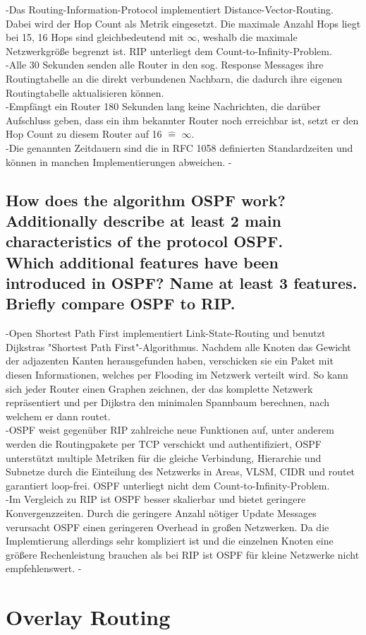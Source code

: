 \documentclass[a4paper,
			llpt,
			solution,
			accentcolor=tud2d,
			colorbacktitle
			]
			{tudexercise}
\newcommand{\8}{$\infty$}
\begin{document}
-Das Routing-Information-Protocol implementiert Distance-Vector-Routing. Dabei wird der Hop Count als Metrik eingesetzt. Die maximale Anzahl Hops liegt bei 15, 16 Hops sind gleichbedeutend mit \8, weshalb die maximale Netzwerkgröße begrenzt ist. RIP unterliegt dem Count-to-Infinity-Problem.\\
-Alle 30 Sekunden senden alle Router in den sog. Response Messages ihre Routingtabelle an die direkt verbundenen Nachbarn, die dadurch ihre eigenen Routingtabelle aktualisieren können.\\
-Empfängt ein Router 180 Sekunden lang keine Nachrichten, die darüber Aufschluss geben, dass ein ihm bekannter Router noch erreichbar ist, setzt er den Hop Count zu diesem Router auf 16 $\hat{=}$ \8.\\
-Die genannten Zeitdauern sind die in RFC 1058 definierten Standardzeiten und können in manchen Implementierungen abweichen.
-\subsection{How does the algorithm OSPF work?\\Additionally describe at least 2 main characteristics  of the protocol OSPF.\\Which additional features have been introduced in OSPF? Name at least 3 features.\\Briefly compare OSPF to RIP.}
-Open Shortest Path First implementiert Link-State-Routing und benutzt Dijkstras "Shortest Path First"-Algorithmus. Nachdem alle Knoten das Gewicht der adjazenten Kanten herausgefunden haben, verschicken sie ein Paket mit diesen Informationen, welches per Flooding im Netzwerk verteilt wird. So kann sich jeder Router einen Graphen zeichnen, der das komplette Netzwerk repräsentiert und per Dijkstra den minimalen Spannbaum berechnen, nach welchem er dann routet.\\
-OSPF weist gegenüber RIP zahlreiche neue Funktionen auf, unter anderem werden die Routingpakete per TCP verschickt und authentifiziert, OSPF unterstützt multiple Metriken für die gleiche Verbindung, Hierarchie und Subnetze durch die Einteilung des Netzwerks in Areas, VLSM, CIDR und routet garantiert loop-frei. OSPF unterliegt nicht dem Count-to-Infinity-Problem.\\
-Im Vergleich zu RIP ist OSPF besser skalierbar und bietet geringere Konvergenzzeiten. Durch die geringere Anzahl nötiger Update Messages verursacht OSPF einen geringeren Overhead in großen Netzwerken. Da die Implemtierung allerdings sehr kompliziert ist und die einzelnen Knoten eine größere Rechenleistung brauchen als bei RIP ist OSPF für kleine Netzwerke nicht empfehlenswert.
-\section{Overlay Routing}
\end{document}
